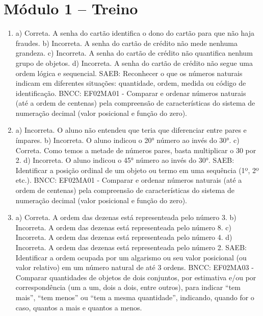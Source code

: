 \pagebreak
\pagestyle{plain}
\footnotesize

\pagecolor{gray!40}

\section*{Módulo 1 – Treino}

\begin{enumerate}
\item
a) Correta. A senha do cartão identifica o dono do cartão para que não haja fraudes.
b) Incorreta. A senha do cartão de crédito não mede nenhuma grandeza.
c) Incorreta. A senha do cartão de crédito não quantifica nenhum grupo de objetos.
d) Incorreta. A senha do cartão de crédito não segue uma ordem lógica e sequencial.
SAEB: Reconhecer o que os números naturais indicam em diferentes
situações: quantidade, ordem, medida ou código de identificação.
BNCC: EF02MA01 - Comparar e ordenar números naturais (até a ordem de
centenas) pela compreensão de características do sistema de numeração decimal (valor
posicional e função do zero).

\item
a) Incorreta. O aluno não entendeu que teria que diferenciar entre pares e ímpares.
b) Incorreta. O aluno indicou o 20° número ao invés do 30°.
c) Correta. Como temos a metade de números pares, basta multiplicar o 30 por 2.
d) Incorreta. O aluno indicou o 45° número ao invés do 30°.
SAEB: Identificar a posição ordinal de um objeto ou termo em uma sequência (1º, 2º etc.).
BNCC: EF02MA01 - Comparar e ordenar números naturais (até a ordem de centenas) pela compreensão de características do sistema de numeração decimal (valor
posicional e função do zero).

\item
a) Correta. A ordem das dezenas está representeada pelo número 3.
b) Incorreta. A ordem das dezenas está representeada pelo número 8.
c) Incorreta. A ordem das dezenas está representeada pelo número 4.
d) Incorreta. A ordem das dezenas está representeada pelo número 2.
SAEB: Identificar a ordem ocupada por um algarismo ou seu valor posicional (ou valor relativo) em um número natural de até 3 ordens. 
BNCC: EF02MA03 - Comparar quantidades de objetos de dois conjuntos, por estimativa e/ou por correspondência (um a um, dois a dois, entre outros), para indicar ``tem mais'', ``tem menos'' ou ``tem a mesma quantidade'', indicando, quando for o caso, quantos a mais e quantos a menos.
\end{enumerate}

